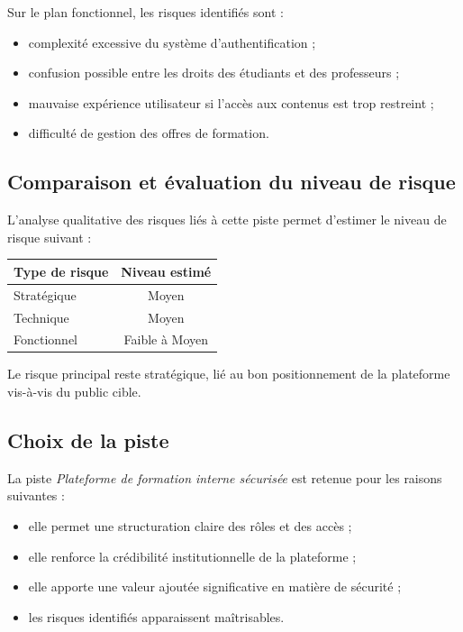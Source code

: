 \documentclass[12pt,a4paper]{report}
\begin{document}
Sur le plan fonctionnel, les risques identifiés sont :
\begin{itemize}
  \item complexité excessive du système d’authentification ;
  \item confusion possible entre les droits des étudiants et des professeurs ;
  \item mauvaise expérience utilisateur si l’accès aux contenus est trop restreint ;
  \item difficulté de gestion des offres de formation.
\end{itemize}

\subsection{Comparaison et évaluation du niveau de risque}

L’analyse qualitative des risques liés à cette piste permet d’estimer le niveau
de risque suivant :

\begin{center}
\begin{tabular}{|l|c|}
\hline
\textbf{Type de risque} & \textbf{Niveau estimé} \\
\hline
Stratégique & Moyen \\
Technique & Moyen \\
Fonctionnel & Faible à Moyen \\
\hline
\end{tabular}
\end{center}

Le risque principal reste stratégique, lié au bon positionnement de la plateforme
vis-à-vis du public cible.

\subsection{Choix de la piste}

La piste \textit{Plateforme de formation interne sécurisée} est retenue pour les
raisons suivantes :
\begin{itemize}
  \item elle permet une structuration claire des rôles et des accès ;
  \item elle renforce la crédibilité institutionnelle de la plateforme ;
  \item elle apporte une valeur ajoutée significative en matière de sécurité ;
  \item les risques identifiés apparaissent maîtrisables.
\end{itemize}
\end{document}
